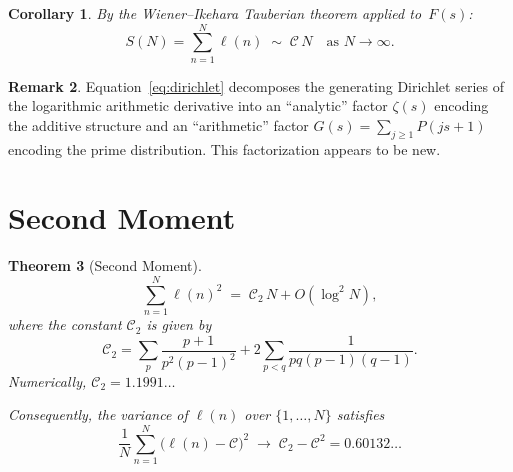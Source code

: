 \documentclass[11pt,a4paper]{amsart}
\theoremstyle{plain}
\newtheorem{theorem}{Theorem}[section]
\newtheorem{corollary}[theorem]{Corollary}
\theoremstyle{definition}
\newtheorem{remark}[theorem]{Remark}
\begin{document}
\begin{corollary}\label{cor:tauberian}
By the Wiener--Ikehara Tauberian theorem applied to~$F(s)$:
\[
S(N) = \sum_{n=1}^{N} \ell(n) \;\sim\; \mathcal{C}\,N \quad\text{as } N \to \infty.
\]
\end{corollary}

\begin{remark}
Equation~\eqref{eq:dirichlet} decomposes the generating Dirichlet series of the 
logarithmic arithmetic derivative into an ``analytic'' factor $\zeta(s)$ 
encoding the additive structure and an ``arithmetic'' factor $G(s) = 
\sum_{j \ge 1} P(js+1)$ encoding the prime distribution.  This factorization 
appears to be new.
\end{remark}

\section{Second Moment}

\begin{theorem}[Second Moment]\label{thm:secondmoment}
\begin{equation}
\sum_{n=1}^{N} \ell(n)^2 \;=\; \mathcal{C}_2\, N + O(\log^2 N),
\end{equation}
where the constant $\mathcal{C}_2$ is given by
\begin{equation}\label{eq:C2}
\mathcal{C}_2 = \sum_{p} \frac{p+1}{p^2(p-1)^2} + 2\sum_{p < q} \frac{1}{pq(p-1)(q-1)}.
\end{equation}
Numerically, $\mathcal{C}_2 = 1.1991\ldots$

Consequently, the variance of $\ell(n)$ over $\{1, \ldots, N\}$ satisfies
\[
\frac{1}{N}\sum_{n=1}^{N} \bigl(\ell(n) - \mathcal{C}\bigr)^2 \;\to\; \mathcal{C}_2 - \mathcal{C}^2 = 0.60132\ldots
\]
\end{theorem}
\end{document}
